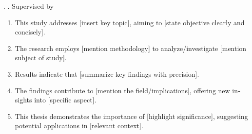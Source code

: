\begin{otherlanguage}{english}
\itshape
\vspace{20pt}

\noindent
\MakeUppercase{\NamaPenulisInggris}. \JudulTesisInggris\unskip. Supervised by
\DaftarPembimbingKapitalInggris

\begin{enumerate}[leftmargin=0.5cm,labelwidth=0.25cm,labelsep=0.25cm,
  align=left,itemsep=0pt,parsep=0pt,topsep=7pt,partopsep=0pt]
  \item This study addresses [insert key topic], aiming to [state objective
    clearly and concisely].
  \item The research employs [mention methodology] to analyze/investigate
    [mention subject of study].
  \item Results indicate that [summarize key findings with precision].
  \item The findings contribute to [mention the field/implications], offering
    new insights into [specific aspect].
  \item This thesis demonstrates the importance of [highlight significance],
    suggesting potential applications in [relevant context].
\end{enumerate}
\end{otherlanguage}
